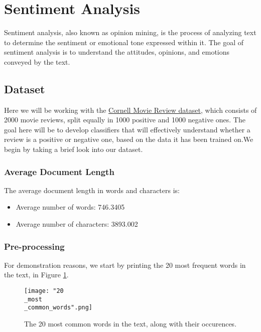 \documentclass[10pt, a4paper]{article}
\begin{document}
		
	
	
	
	
	
	
	
	\section{Sentiment Analysis}
	
	Sentiment analysis, also known as opinion mining, is the process of analyzing text to determine the sentiment or emotional tone expressed within it. The goal of sentiment analysis is to understand the attitudes, opinions, and emotions conveyed by the text. 
	
	
	\subsection{Dataset}
	Here we will be working with the \href{http://www.cs.cornell.edu/people/pabo/movie-review-data/}{Cornell Movie Review dataset}, which consists of 2000 movie reviews, split equally in 1000 positive and 1000 negative ones. The goal here will be to develop classifiers that will effectively understand whether a review is a positive or negative one, based on the data it has been trained on.We begin by taking a brief look into our dataset.
	
	
	\subsubsection{Average Document Length }
	
	The average document length in words and characters is:
	\begin{itemize}
		\item Average number of words: 746.3405
		\item Average number of characters: 3893.002
	\end{itemize}


	\subsubsection{Pre-processing}
	
	For demonstration reasons, we start by printing the 20 most frequent words in the text, in Figure \ref{fig::20_common}.
	
	\begin{figure}
		\centering
		\texttt{[image: "20\\\_most\\\_common\_words".png]}
		\caption{The 20 most common words in the text, along with their occurences.}
		\label{fig::20_common}
	\end{figure}
	
\end{document}
